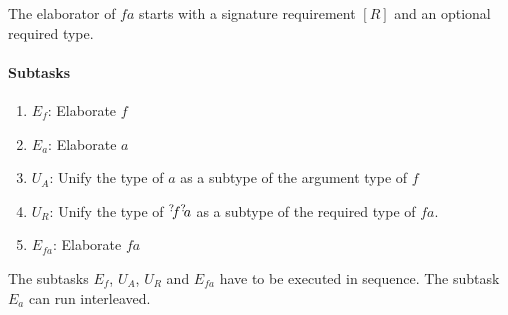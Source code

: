 The elaborator of $f a$ starts with a signature requirement $[R]$ and
an optional required type.

\paragraph{Subtasks}
\begin{enumerate}
    \item $E_f$: Elaborate $f$
    \item $E_a$: Elaborate $a$
    \item $U_{A}$: Unify the type of $a$ as a subtype of the argument type of
        $f$
    \item $U_{R}$: Unify the type of ${{}^? \kern-0.2em f} {{}^? \kern-0.2em a}$ as a subtype of the
        required type of $fa$.
    \item $E_{fa}$: Elaborate $fa$
\end{enumerate}

The subtasks $E_f$, $U_A$, $U_R$ and $E_{fa}$ have to be executed in sequence. The
subtask $E_a$ can run interleaved.


